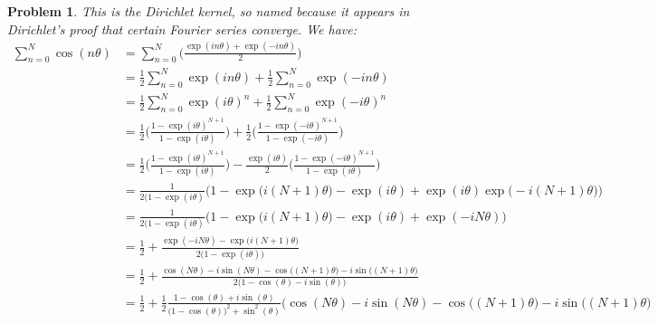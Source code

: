 \documentclass{article}
\theoremstyle{plain}
\theoremstyle{normal}
\newtheorem{problem}{Problem}[section]
\begin{document}
        \begin{problem}
            This is the Dirichlet kernel, so named because it appears in
            Dirichlet's proof that certain Fourier series converge. We have:
            \begin{align}
                \sum_{n=0}^{N}\cos(n\theta)&=
                    \sum_{n=0}^{N}\Big(
                        \frac{\exp(in\theta)+\exp(-in\theta)}{2}
                    \Big)\\
                &=\frac{1}{2}\sum_{n=0}^{N}\exp(in\theta)+
                    \frac{1}{2}\sum_{n=0}^{N}\exp(-in\theta)\\
                &=\frac{1}{2}\sum_{n=0}^{N}\exp(i\theta)^{n}+
                    \frac{1}{2}\sum_{n=0}^{N}\exp(-i\theta)^{n}\\
                &=\frac{1}{2}\Big(
                    \frac{1-\exp(i\theta)^{N+1}}{1-\exp(i\theta)}
                \Big)+\frac{1}{2}\Big(
                    \frac{1-\exp(-i\theta)^{N+1}}{1-\exp(-i\theta)}
                \Big)\\
                &=\frac{1}{2}\Big(
                    \frac{1-\exp(i\theta)^{N+1}}{1-\exp(i\theta)}
                \Big)-\frac{\exp(i\theta)}{2}\Big(
                    \frac{1-\exp(-i\theta)^{N+1}}{1-\exp(i\theta)}
                \Big)\\
                &=\frac{1}{2(1-\exp(i\theta)}
                \Big(
                    1-\exp\big(i(N+1)\theta\big)-\exp(i\theta)
                    +\exp(i\theta)\exp\big(-i(N+1)\theta\big)
                \Big)\\
                &=\frac{1}{2(1-\exp(i\theta)}
                \Big(
                    1-\exp\big(i(N+1)\theta\big)-\exp(i\theta)
                    +\exp(-iN\theta)
                \Big)\\
                &=\frac{1}{2}+
                \frac{\exp(-iN\theta)-\exp\big(i(N+1)\theta\big)}
                     {2\big(1-\exp(i\theta)\big)}\\
                &=\frac{1}{2}+
                    \frac{\cos(N\theta)-i\sin(N\theta)-
                          \cos\big((N+1)\theta)-i\sin\big((N+1)\theta\big)}
                         {2\big(1-\cos(\theta)-i\sin(\theta)\big)}\\
                &=\frac{1}{2}+
                    \frac{1}{2}\frac{1-\cos(\theta)+i\sin(\theta)}
                         {\big(1-\cos(\theta)\big)^{2}+\sin^{2}(\theta)}
                    \Big(\cos(N\theta)-i\sin(N\theta)-
                          \cos\big((N+1)\theta)-i\sin\big((N+1)\theta\Big)\\

\end{align}
\end{problem}
\end{document}
